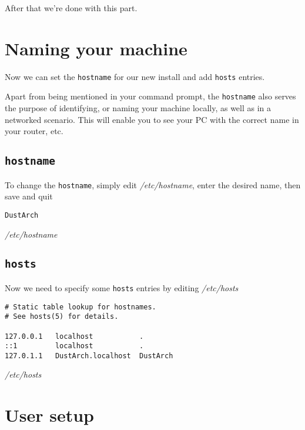 \documentclass[10pt]{dustdoc}
\begin{document}
After that we’re done with this part.

\section{Naming your machine}
\label{sec:naming-your-machine}

Now we can set the \texttt{hostname} for our new install and add \texttt{hosts} entries.

Apart from being mentioned in your command prompt, the \texttt{hostname} also serves the purpose of identifying, or naming your machine locally, as well as in a networked scenario.  This will enable you to see your PC with the correct name in your router, etc.

\subsection{\texttt{hostname}}
\label{sec:hostname}

To change the \texttt{hostname}, simply edit \textit{/etc/hostname}, enter the desired name, then save and quit

\begin{mintedlisting}
    \begin{verbatim}
DustArch
    \end{verbatim}

    \caption{\textit{/etc/hostname}}
\end{mintedlisting}

\subsection{\texttt{hosts}}
\label{sec:hosts}

Now we need to specify some \texttt{hosts} entries by editing \textit{/etc/hosts}

\begin{mintedlisting}
    \begin{verbatim}
# Static table lookup for hostnames.
# See hosts(5) for details.

127.0.0.1   localhost           .
::1         localhost           .
127.0.1.1   DustArch.localhost  DustArch
    \end{verbatim}

    \caption{\textit{/etc/hosts}}
\end{mintedlisting}

\section{User setup}
\label{sec:user-setup}
\end{document}
